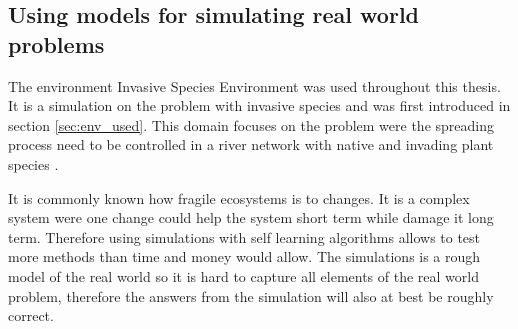 \subsection{Using models for simulating real world problems }
\label{sec:ethics_inv_spec}


The environment Invasive Species Environment was used throughout this thesis. It is a simulation on the problem with invasive species and was first introduced in section \ref{sec:env_used}. This domain focuses on the problem were the spreading process need to be controlled in a river network with native and invading plant species \parencite{invasiveSpecis2014:Online}. 





It is commonly known how fragile ecosystems is to changes. It is a complex system were one change could help the system short term while damage it long term. Therefore using simulations with self learning algorithms allows to test more methods than time and money would allow. The simulations is a rough model of the real world so it is hard to capture all elements of the real world problem, therefore the answers from the simulation will also at best be roughly correct.

